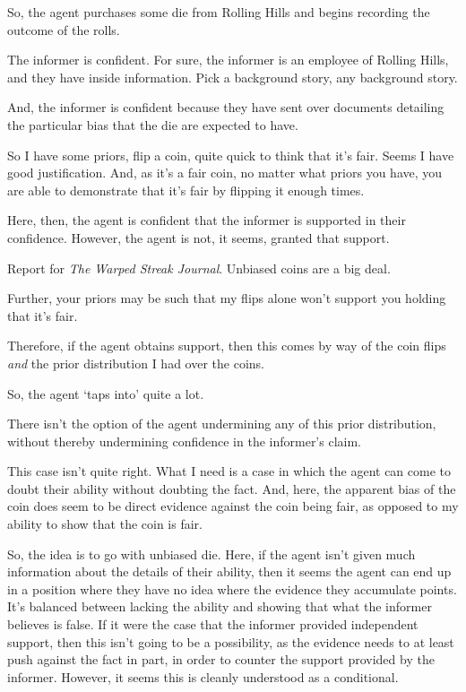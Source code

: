\documentclass[10pt]{article}
\begin{document}
So, the agent purchases some die from Rolling Hills and begins recording the outcome of the rolls.

The informer is confident.
For sure, the informer is an employee of Rolling Hills, and they have inside information.
Pick a background story, any background story.

And, the informer is confident because they have sent over documents detailing the particular bias that the die are expected to have.


\begin{note}
  So I have some priors, flip a coin, quite quick to think that it's fair.
  Seems I have good justification.
  And, as it's a fair coin, no matter what priors you have, you are able to demonstrate that it's fair by flipping it enough times.

  Here, then, the agent is confident that the informer is supported in their confidence.
  However, the agent is not, it seems, granted that support.

  Report for \emph{The Warped Streak Journal}.
  Unbiased coins are a big deal.



  Further, your priors may be such that my flips alone won't support you holding that it's fair.

  Therefore, if the agent obtains support, then this comes by way of the coin flips \emph{and} the prior distribution I had over the coins.

  So, the agent `taps into' quite a lot.

  There isn't the option of the agent undermining any of this prior distribution, without thereby undermining confidence in the informer's claim.

  {
    \color{red}
    This case isn't quite right.
    What I need is a case in which the agent can come to doubt their ability without doubting the fact.
    And, here, the apparent bias of the coin does seem to be direct evidence against the coin being fair, as opposed to my ability to show that the coin is fair.

    So, the idea is to go with unbiased die.
    Here, if the agent isn't given much information about the details of their ability, then it seems the agent can end up in a position where they have no idea where the evidence they accumulate points.
    It's balanced between lacking the ability and showing that what the informer believes is false.
    If it were the case that the informer provided independent support, then this isn't going to be a possibility, as the evidence needs to at least push against the fact in part, in order to counter the support provided by the informer.
    However, it seems this is cleanly understood as a conditional.

}
\end{note}
\end{document}
